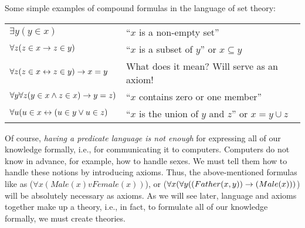 \begin{example}
Some simple examples of compound formulas in the language of set theory:
\begin{center}
\begin{tabular}{l l}
\(\exists y(y \in x)\)
& ``\(x\) is a non-empty set'' \\
\(\forall z (z \in x\rightarrow z \in y)\)
& ``\(x\) is a subset of \(y\)'' or \(x\subseteq y\) \\
\(\forall z (z\in x\leftrightarrow z\in y)\rightarrow x=y\)
& What does it mean? Will serve as an axiom! \\
\(\forall y\forall z(y\in x \wedge z\in x)\rightarrow y=z)\)
& ``\(x\) contains zero or one member'' \\
\(\forall u (u\in x\leftrightarrow (u\in y \vee u\in z)\)
& ``\(x\) is the union of \(y\) and \(z\)'' or \(x=y\cup z\)
\end{tabular}
\end{center}
\end{example}

Of course, \emph{having a predicate language is not enough} for expressing all of our knowledge formally, i.e., for communicating it to computers.
Computers do not know in advance, for example, how to handle sexes.
We must tell them how to handle these notions by introducing axioms. Thus, the above-mentioned formulas like as (\(\forall x(Male(x) v Female(x))\)), or (\(\forall x(\forall y((Father(x, y))\rightarrow (Male(x)))\)) will be absolutely necessary as axioms.
As we will see later, language and axioms together make up a theory, i.e., in fact, to formulate all of our knowledge formally, we must create theories.

